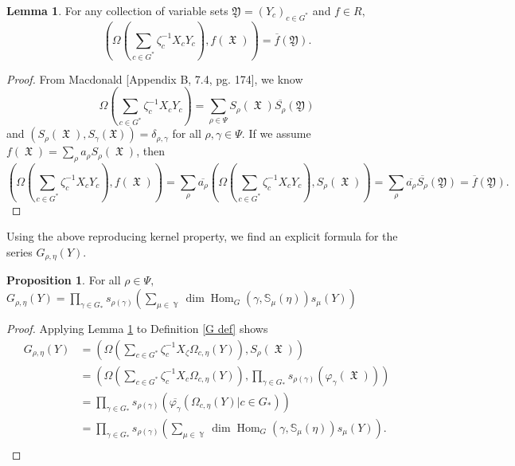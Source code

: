 \documentclass[12pt,reqno]{amsart}
\theoremstyle{definition}
\newtheorem{lem}[thm]{Lemma}
\newtheorem{prop}[thm]{Proposition}
\DeclareMathOperator{\Par}{\mathbb{Y}}
\DeclareMathOperator{\Hom}{\mathrm{Hom}}
\DeclareMathOperator{\fX}{\mathfrak{X}}
\begin{document}
\begin{lem}\label{wreath kernel lem}
For any collection of variable sets $\mathfrak{Y} = (Y_{c})_{c \in G^*}$ and $f \in R,$
    $$\left( \Omega \left( \sum_{c \in G^*} \zeta_c^{-1} X_{c}Y_{c} \right), f(\fX) \right) = \overline{f}(\mathfrak{Y}).$$
\end{lem}
\begin{proof}
    From Macdonald \cite{Macdonald} [Appendix B, 7.4, pg. 174], we know
    $$\Omega \left( \sum_{c \in G^*} \zeta_c^{-1} X_{c}Y_{c} \right) = \sum_{\rho \in \Psi} S_{\rho}(\fX) \overline{S_{\rho}}(\mathfrak{Y})$$ and $(S_{\rho}(\fX),S_{\gamma}(\mathfrak{X})) = \delta_{\rho,\gamma}$ for all $\rho,\gamma \in \Psi.$ If we assume $f(\fX) = \sum_{\rho} a_{\rho} S_{\rho}(\fX)$, then 
    $$\left( \Omega \left( \sum_{c\in G^*} \zeta_c^{-1} X_{c}Y_{c} \right), f(\fX) \right) = \sum_{\rho} \overline{a_{\rho}}\left( \Omega \left( \sum_{c \in G^*} \zeta_c^{-1} X_{c}Y_{c} \right),  S_{\rho}(\fX) \right) = \sum_{\rho} \overline{a_{\rho}} \overline{S_{\rho}}(\mathfrak{Y}) = \overline{f}(\mathfrak{Y}).$$ 
\end{proof}

Using the above reproducing kernel property, we find an explicit formula for the series $G_{\rho,\eta}(Y).$ 

\begin{prop}\label{plethystic formula for irrep sub prop}
For all $\rho \in \Psi,$
    $G_{\rho,\eta}(Y) = \prod_{\gamma \in G_*} s_{\rho(\gamma)}\left(\sum_{\mu \in \Par} \dim \Hom_{G}(\gamma, \mathbb{S}_{\mu}(\eta)) s_{\mu}(Y)\right)$
\end{prop}
\begin{proof}
    Applying Lemma \ref{wreath kernel lem} to Definition \ref{G def} shows
    \begin{align*}
        G_{\rho,\eta}(Y) &= \left( \Omega\left( \sum_{c \in G^*} \zeta_c^{-1} X_{\zeta} \Omega_{c,\eta}(Y)   \right) , S_{\rho}(\fX) \right) \\
        &= \left( \Omega\left( \sum_{c \in G^*} \zeta_c^{-1} X_{c} \Omega_{c,\eta}(Y)   \right) , \prod_{\gamma \in G_*} s_{\rho(\gamma)}(\varphi_{\gamma}(\fX)) \right)\\
        &= \prod_{\gamma\in G_*} s_{\rho(\gamma)}\left(\overline{\varphi_{\gamma}}\left( \Omega_{c,\eta}(Y) | c \in G_* \right)\right)\\
        &= \prod_{\gamma \in G_*} s_{\rho(\gamma)}\left(\sum_{\mu \in \Par} \dim \Hom_{G}(\gamma, \mathbb{S}_{\mu}(\eta)) s_{\mu}(Y)\right).\\
    \end{align*}
    
\end{proof}
\end{document}

